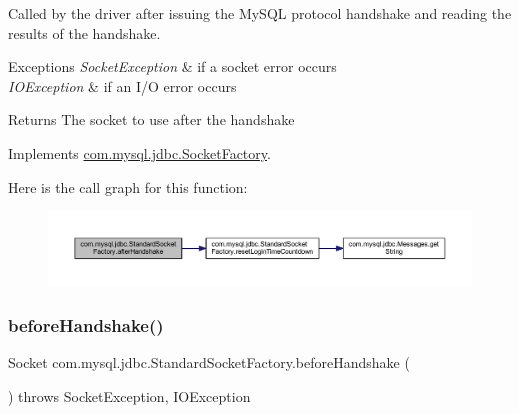 Called by the driver after issuing the My\+S\+QL protocol handshake and reading the results of the handshake.


\begin{DoxyExceptions}{Exceptions}
{\em Socket\+Exception} & if a socket error occurs \\
\hline
{\em I\+O\+Exception} & if an I/O error occurs\\
\hline
\end{DoxyExceptions}
\begin{DoxyReturn}{Returns}
The socket to use after the handshake 
\end{DoxyReturn}


Implements \mbox{\hyperlink{interfacecom_1_1mysql_1_1jdbc_1_1_socket_factory_adc5277dd008da61b24261a983202f5bf}{com.\+mysql.\+jdbc.\+Socket\+Factory}}.

Here is the call graph for this function\+:
\nopagebreak
\begin{figure}[H]
\begin{center}
\leavevmode
\includegraphics[width=350pt]{classcom_1_1mysql_1_1jdbc_1_1_standard_socket_factory_a7387cf40cb31ead4c39dcc642d1980b5_cgraph}
\end{center}
\end{figure}
\mbox{\label{classcom_1_1mysql_1_1jdbc_1_1_standard_socket_factory_a0fc01cf46005340dec4113471621f792}} 
\subsubsection{\texorpdfstring{before\+Handshake()}{beforeHandshake()}}
{\footnotesize\ttfamily Socket com.\+mysql.\+jdbc.\+Standard\+Socket\+Factory.\+before\+Handshake (\begin{DoxyParamCaption}{ }\end{DoxyParamCaption}) throws Socket\+Exception, I\+O\+Exception}

